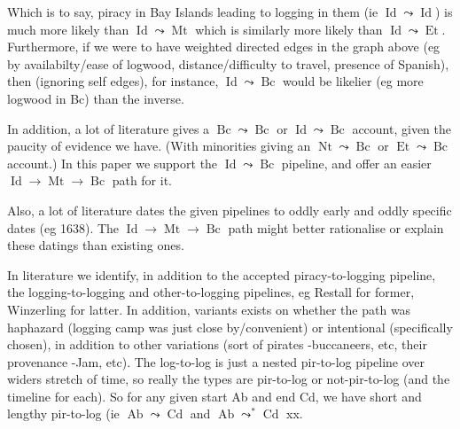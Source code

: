 \documentclass{amsart}
\DeclareMathOperator{\id}{Id}%
\DeclareMathOperator{\mt}{Mt}%
\DeclareMathOperator{\bc}{Bc}%
\DeclareMathOperator{\et}{Et}%
\DeclareMathOperator{\nt}{Nt}%
\DeclareMathOperator{\ab}{Ab}%
\DeclareMathOperator{\cd}{Cd}%
\theoremstyle{definition}%
\theoremstyle{definition}%
\theoremstyle{remark}%
\theoremstyle{definition}%
\theoremstyle{definition}%
\begin{document}
Which is to say, piracy in Bay Islands leading to logging in them (ie \(\id\leadsto\id\)) is much more likely than \(\id\leadsto\mt\) which is similarly more likely than 
\(\id\leadsto\et\). Furthermore, if we were to have weighted directed edges in the graph above (eg by availabilty/ease of logwood, distance/difficulty to travel, presence of Spanish), then (ignoring self edges), for instance, \(\id\leadsto\bc\) would be likelier (eg more logwood in Bc) than the inverse.

In addition, a lot of literature gives a \(\bc\leadsto\bc\) or \(\id\leadsto\bc\) account, given the paucity of evidence we have. (With minorities giving an \(\nt\leadsto\bc\) or \(\et\leadsto\bc\) account.) In this paper we support the \(\id\leadsto\bc\) pipeline, and offer an easier \(\id\to\mt\to\bc\) path for it.

Also, a lot of literature dates the given pipelines to oddly early and oddly specific dates (eg 1638). The \(\id\to\mt\to\bc\) path might better rationalise or explain these datings than existing ones.

In literature we identify, in addition to the accepted piracy-to-logging pipeline, the logging-to-logging and other-to-logging pipelines, eg Restall for former, Winzerling for latter. In addition, variants exists on whether the path was haphazard (logging camp was just close by/convenient) or intentional (specifically chosen), in addition to other variations (sort of pirates -buccaneers, etc, their provenance -Jam, etc). The log-to-log is just a nested pir-to-log pipeline over widers stretch of time, so really the types are pir-to-log or not-pir-to-log (and the timeline for each). So for any given start Ab and end Cd, we have short and lengthy pir-to-log (ie \(\ab\leadsto\cd\) and \(\ab\leadsto^{*}\cd\) xx.
%
%
%
%
\end{document}
